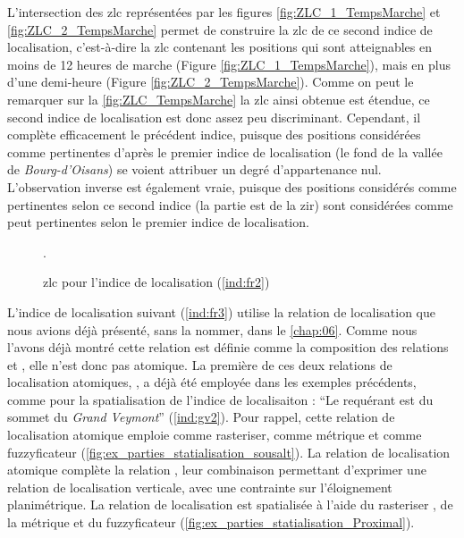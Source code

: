 L'intersection des \ac{zlc} représentées par les figures
\ref{fig:ZLC_1_TempsMarche} et \ref{fig:ZLC_2_TempsMarche} permet de
construire la \ac{zlc} de ce second indice de localisation,
c'est-à-dire la \ac{zlc} contenant les positions qui sont atteignables
en moins de 12 heures de marche (Figure \ref{fig:ZLC_1_TempsMarche}),
mais en plus d'une demi-heure (Figure
\ref{fig:ZLC_2_TempsMarche}). Comme on peut le remarquer sur la
\autoref{fig:ZLC_TempsMarche} la \ac{zlc} ainsi obtenue est étendue,
ce second indice de localisation est donc assez peu
discriminant. Cependant, il complète efficacement le précédent indice,
puisque des positions considérées comme pertinentes d'après le premier
indice de localisation (\eg le fond de la vallée de
\emph{Bourg-d'Oisans}) se voient attribuer un degré d'appartenance
nul. L'observation inverse est également vraie, puisque des positions
considérés comme pertinentes selon ce second indice (\eg la partie est
de la \ac{zir}) sont considérées comme peut pertinentes selon le
premier indice de localisation.

\begin{figure}[htb]
  \centering
  
  \caption{\ac{zlc} pour l'indice de localisation (\ref{ind:fr2})}
  \label{fig:ZLC_TempsMarche}.  
\end{figure}


L'indice de localisation suivant (\ref{ind:fr3}) utilise la relation
de localisation  que nous avions déjà
présenté, sans la nommer, dans le \autoref{chap:06}. Comme nous
l'avons déjà montré cette relation est définie comme la composition
des relations  et ,
elle n'est donc pas atomique. La première de ces deux relations de
localisation atomiques, , a déjà été
employée dans les exemples précédents, comme pour la spatialisation de
l'indice de localisaiton : \enquote{Le requérant est
   du sommet du \emph{Grand Veymont}}
(\ref{ind:gv2}). Pour rappel, cette relation de localisation atomique
emploie  comme rasteriser,
 comme métrique et
 comme fuzzyficateur
(\autoref{fig:ex_parties_statialisation_sousalt}). La relation de
localisation atomique  complète la relation
, leur combinaison permettant d'exprimer une
relation de localisation verticale, avec une contrainte sur
l'éloignement planimétrique. La relation de localisation
 est spatialisée à l'aide du rasteriser
, de la métrique
 et du fuzzyficateur
(\autoref{fig:ex_parties_statialisation_Proximal}).

